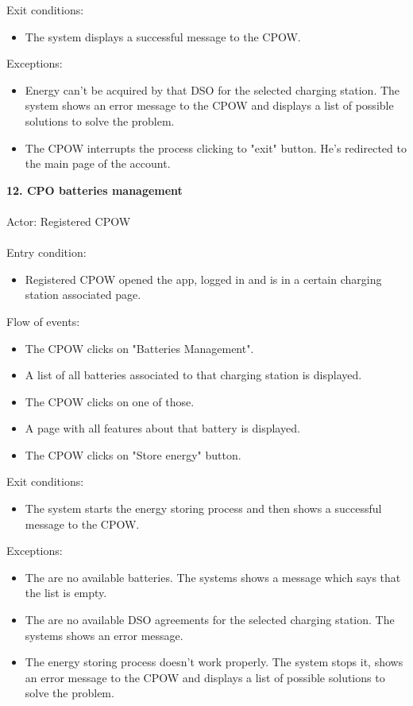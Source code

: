 \documentclass[a4paper]{report}
\begin{document}
Exit conditions:
\begin{itemize}
\item The system displays a successful message to the CPOW.
\end{itemize}
Exceptions:
\begin{itemize}
\item Energy can't be acquired by that DSO for the selected charging station. The system shows an error message to the CPOW and displays a list of possible solutions to solve the problem.
\item The CPOW interrupts the process clicking to "exit" button. He's redirected to the main page of the account.
\end{itemize}
\textbf{12. CPO batteries management}\label{uc:8}
\\ \\
Actor: Registered CPOW \\ \\
Entry condition:
\begin{itemize}
\item Registered CPOW opened the app, logged in and is in a certain charging station associated page.
\end{itemize}
Flow of events:
\begin{itemize}
\item The CPOW clicks on "Batteries Management".
\item A list of all batteries associated to that charging station is displayed.
\item The CPOW clicks on one of those.
\item A page with all features about that battery is displayed.
\item The CPOW clicks on "Store energy" button.
\end{itemize}
Exit conditions:
\begin{itemize}
\item The system starts the energy storing process and then shows a successful message to the CPOW.
\end{itemize}
Exceptions:
\begin{itemize}
\item The are no available batteries. The systems shows a message which says that the list is empty.
\item The are no available DSO agreements for the selected charging station. The systems shows an error message.
\item The energy storing process doesn't work properly. The system stops it, shows an error message to the CPOW and displays a list of possible solutions to solve the problem.
\end{itemize}
\end{document}
